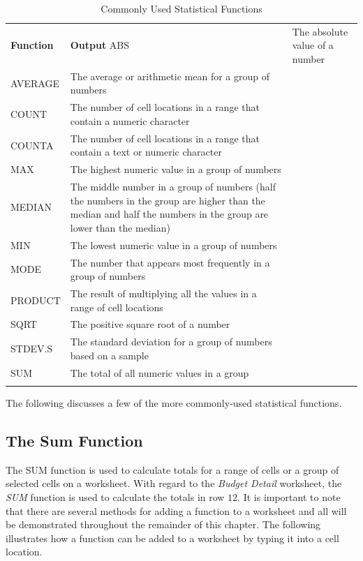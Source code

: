 \begin{table}[H]
	{\small
		\begin{longtable}{L{0.75in}L{3.50in}} %
			\textbf{Function} & \textbf{Output} \endhead
			\hline
			ABS & The absolute value of a number\\
			AVERAGE & The average or arithmetic mean for a group of numbers\\
			COUNT & The number of cell locations in a range that contain a numeric character\\
			COUNTA & The number of cell locations in a range that contain a text or numeric character\\
			MAX & The highest numeric value in a group of numbers\\
			MEDIAN & The middle number in a group of numbers (half the numbers in the group are higher than the median and half the numbers in the group are lower than the median)\\
			MIN & The lowest numeric value in a group of numbers\\
			MODE & The number that appears most frequently in a group of numbers\\
			PRODUCT & The result of multiplying all the values in a range of cell locations\\
			SQRT & The positive square root of a number\\
			STDEV.S & The standard deviation for a group of numbers based on a sample\\
			SUM & The total of all numeric values in a group\\
			\caption{Commonly Used Statistical Functions}
			\label{02:tab04}
		\end{longtable}
	} %
\end{table}

The following discusses a few of the more commonly-used statistical functions.

\subsection{The Sum Function}

The SUM function is used to calculate totals for a range of cells or a group of selected cells on a worksheet. With regard to the \textit{Budget Detail} worksheet, the \textit{SUM} function is used to calculate the totals in row $ 12 $. It is important to note that there are several methods for adding a function to a worksheet and all will be demonstrated throughout the remainder of this chapter. The following illustrates how a function can be added to a worksheet by typing it into a cell location.

